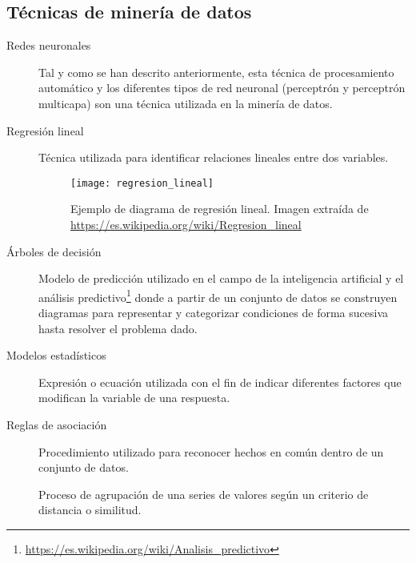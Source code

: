 \subsection{Técnicas de minería de datos}
\begin{description}
    \item[Redes neuronales] Tal y como se han descrito anteriormente, esta técnica de procesamiento automático y los diferentes tipos de red neuronal (perceptrón y perceptrón multicapa) son una técnica utilizada en la minería de datos.
    \item[Regresión lineal] Técnica utilizada para identificar relaciones lineales entre dos variables.
    
    \FloatBarrier
    \begin{figure}[!h]
    \centering
    \texttt{[image: regresion\_lineal]}
    \caption[Ejemplo de diagrama de regresión lineal]{Ejemplo de diagrama de regresión lineal.
    \newline
    Imagen extraída de \url{https://es.wikipedia.org/wiki/Regresion\_lineal}}
    \label{fig}
    \end{figure}
    \FloatBarrier
    
    \item[Árboles de decisión] Modelo de predicción utilizado en el campo de la inteligencia artificial y el análisis predictivo\footnote{\url{https://es.wikipedia.org/wiki/Analisis\_predictivo}} donde a partir de un conjunto de datos se construyen diagramas para representar y categorizar condiciones de forma sucesiva hasta resolver el problema dado.
    
    
    \item[Modelos estadísticos]Expresión o ecuación utilizada con el fin de indicar diferentes factores que modifican la variable de una respuesta.
    \item[Reglas de asociación] Procedimiento utilizado para reconocer hechos en común dentro de un conjunto de datos.
    \item[] Proceso de agrupación de una series de valores según un criterio de distancia o similitud.
    

\end{description}
